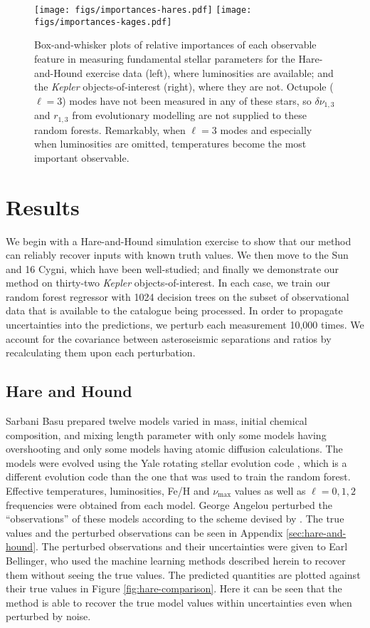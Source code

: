 \documentclass[manuscript]{aastex}
\begin{document}
\begin{figure*}
    \centering
    \texttt{[image: figs/importances-hares.pdf]}\hfill
    \texttt{[image: figs/importances-kages.pdf]}
    \caption{Box-and-whisker plots of relative importances of each observable feature in measuring fundamental stellar parameters for the Hare-and-Hound exercise data (left), where luminosities are available; and the \emph{Kepler} objects-of-interest (right), where they are not. Octupole ($\ell=3$) modes have not been measured in any of these stars, so $\delta\nu_{1,3}$ and $r_{1,3}$ from evolutionary modelling are not supplied to these random forests. Remarkably, when $\ell=3$ modes and especially when luminosities are omitted, temperatures become the most important observable. }
    \label{fig:importances2}
\end{figure*}

\section{Results}
We begin with a Hare-and-Hound simulation exercise to show that our method can reliably recover inputs with known truth values. We then move to the Sun and 16 Cygni, which have been well-studied; and finally we demonstrate our method on thirty-two \emph{Kepler} objects-of-interest. In each case, we train our random forest regressor with 1024 decision trees on the subset of observational data that is available to the catalogue being processed. In order to propagate uncertainties into the predictions, we perturb each measurement 10,000 times. We account for the covariance between asteroseismic separations and ratios by recalculating them upon each perturbation. 

\subsection{Hare and Hound} 
Sarbani Basu prepared twelve models varied in mass, initial chemical composition, and mixing length parameter with only some models having overshooting and only some models having atomic diffusion calculations. The models were evolved using the Yale rotating stellar evolution code \citep{2008Ap&SS.316...31D}, which is a different evolution code than the one that was used to train the random forest. Effective temperatures, luminosities, Fe/H and $\nu_{\max}$ values as well as $\ell=0,1,2$ frequencies were obtained from each model. George Angelou perturbed the ``observations'' of these models according to the scheme devised by \citet{spaceinn}. The true values and the perturbed observations can be seen in Appendix \ref{sec:hare-and-hound}. The perturbed observations and their uncertainties were given to Earl Bellinger, who used the machine learning methods described herein to recover them without seeing the true values. The predicted quantities are plotted against their true values in Figure \ref{fig:hare-comparison}. Here it can be seen that the method is able to recover the true model values within uncertainties even when perturbed by noise. 
\end{document}
